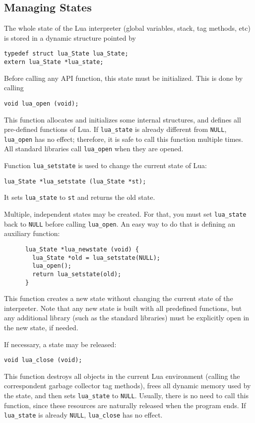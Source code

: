 \documentclass[11pt]{article}
\newcommand{\Deffunc}[1]{\index{#1}}
\begin{document}
\subsection{Managing States} \label{mangstate}
The whole state of the Lua interpreter
(global variables, stack, tag methods, etc)
is stored in a dynamic structure pointed by\Deffunc{lua_state}
\begin{verbatim}
typedef struct lua_State lua_State;
extern lua_State *lua_state;
\end{verbatim}

Before calling any API function,
this state must be initialized.
This is done by calling\Deffunc{lua_open}
\begin{verbatim}
void lua_open (void);
\end{verbatim}
This function allocates and initializes some internal structures,
and defines all pre-defined functions of Lua.
If \verb|lua_state| is already different from \verb|NULL|,
\verb|lua_open| has no effect;
therefore, it is safe to call this function multiple times.
All standard libraries call \verb|lua_open| when they are opened.

Function \verb|lua_setstate| is used to change the current state
of Lua:\Deffunc{lua_setstate}
\begin{verbatim}
lua_State *lua_setstate (lua_State *st);
\end{verbatim}
It sets \verb|lua_state| to \verb|st| and returns the old state.

Multiple, independent states may be created.
For that, you must set \verb|lua_state| back to \verb|NULL| before
calling \verb|lua_open|.
An easy way to do that is defining an auxiliary function:
\begin{verbatim}
      lua_State *lua_newstate (void) {
        lua_State *old = lua_setstate(NULL);
        lua_open();
        return lua_setstate(old);
      }
\end{verbatim}
This function creates a new state without changing the current state
of the interpreter.
Note that any new state is built with all predefined functions,
but any additional library (such as the standard libraries) must be
explicitly open in the new state, if needed.

If necessary, a state may be released:\Deffunc{lua_close}
\begin{verbatim}
void lua_close (void);
\end{verbatim}
This function destroys all objects in the current Lua environment
(calling the correspondent garbage collector tag methods),
frees all dynamic memory used by the state,
and then sets \verb|lua_state| to \verb|NULL|.
Usually, there is no need to call this function,
since these resources are naturally released when the program ends.
If \verb|lua_state| is already \verb|NULL|,
\verb|lua_close| has no effect.
\end{document}
